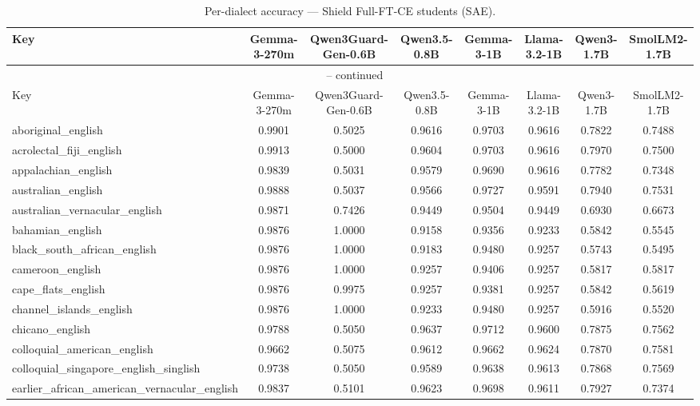 \begin{landscape}
\begin{longtable}{lccccccc}
\caption{Per-dialect accuracy — Shield Full-FT-CE students (SAE).} \\
\label{tab:students_full_ft_ce_per_dialect_sae}
\toprule
Key & Gemma-3-270m & Qwen3Guard-Gen-0.6B & Qwen3.5-0.8B & Gemma-3-1B & Llama-3.2-1B & Qwen3-1.7B & SmolLM2-1.7B \\
\midrule
\endfirsthead
\multicolumn{8}{c}{\tablename\ \thetable{} -- continued} \\
\toprule
Key & Gemma-3-270m & Qwen3Guard-Gen-0.6B & Qwen3.5-0.8B & Gemma-3-1B & Llama-3.2-1B & Qwen3-1.7B & SmolLM2-1.7B \\
\midrule
\endhead
aboriginal\_english & 0.9901 & 0.5025 & 0.9616 & 0.9703 & 0.9616 & 0.7822 & 0.7488 \\
acrolectal\_fiji\_english & 0.9913 & 0.5000 & 0.9604 & 0.9703 & 0.9616 & 0.7970 & 0.7500 \\
appalachian\_english & 0.9839 & 0.5031 & 0.9579 & 0.9690 & 0.9616 & 0.7782 & 0.7348 \\
australian\_english & 0.9888 & 0.5037 & 0.9566 & 0.9727 & 0.9591 & 0.7940 & 0.7531 \\
australian\_vernacular\_english & 0.9871 & 0.7426 & 0.9449 & 0.9504 & 0.9449 & 0.6930 & 0.6673 \\
bahamian\_english & 0.9876 & 1.0000 & 0.9158 & 0.9356 & 0.9233 & 0.5842 & 0.5545 \\
black\_south\_african\_english & 0.9876 & 1.0000 & 0.9183 & 0.9480 & 0.9257 & 0.5743 & 0.5495 \\
cameroon\_english & 0.9876 & 1.0000 & 0.9257 & 0.9406 & 0.9257 & 0.5817 & 0.5817 \\
cape\_flats\_english & 0.9876 & 0.9975 & 0.9257 & 0.9381 & 0.9257 & 0.5842 & 0.5619 \\
channel\_islands\_english & 0.9876 & 1.0000 & 0.9233 & 0.9480 & 0.9257 & 0.5916 & 0.5520 \\
chicano\_english & 0.9788 & 0.5050 & 0.9637 & 0.9712 & 0.9600 & 0.7875 & 0.7562 \\
colloquial\_american\_english & 0.9662 & 0.5075 & 0.9612 & 0.9662 & 0.9624 & 0.7870 & 0.7581 \\
colloquial\_singapore\_english\_singlish & 0.9738 & 0.5050 & 0.9589 & 0.9638 & 0.9613 & 0.7868 & 0.7569 \\
earlier\_african\_american\_vernacular\_english & 0.9837 & 0.5101 & 0.9623 & 0.9698 & 0.9611 & 0.7927 & 0.7374 \\

\end{longtable}
\end{landscape}
